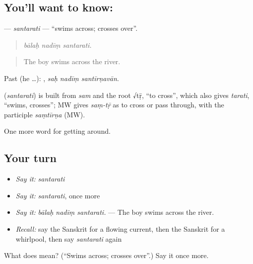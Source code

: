 \subsection*{You'll want to know: }
\textbf{} — \emph{santarati} — \textquotedblleft{}swims across; crosses over\textquotedblright{}.

\begin{quote}
  
\end{quote}

\begin{quote}
\emph{bālaḥ nadīṃ santarati.}
\end{quote}

\begin{quote}
The boy swims across the river.
\end{quote}

Past (he …):   , \emph{saḥ nadīṃ santīrṇavān}.

\begin{cousinweb}
\textbf{} (\emph{santarati}) is built from \emph{sam} and the root √tṝ, \textquotedblleft{}to cross\textquotedblright{}, which also gives \emph{tarati}, \textquotedblleft{}swims, crosses\textquotedblright{}; MW gives \emph{saṃ-tṝ} as to cross or pass through, with the participle \emph{saṃtīrṇa} (MW).
\end{cousinweb}

\begin{grammarlens}[title={What you've built}]
One more word for getting around.
\end{grammarlens}

\subsection*{Your turn}
\begin{itemize}
\raggedright
  \item \emph{Say it:} \emph{santarati}
  \item \emph{Say it:} \emph{santarati}, once more
  \item \emph{Say it:} \emph{bālaḥ nadīṃ santarati.} — The boy swims across the river.
  \item \emph{Recall:} say the Sanskrit for a flowing current, then the Sanskrit for a whirlpool, then say \emph{santarati} again
\end{itemize}

\begin{tcolorbox}[breakable,colback=teal!4,colframe=teal!35!black,title={Before you move on}]
What does  mean? (\textquotedblleft{}Swims across; crosses over\textquotedblright{}.) Say it once more.
\end{tcolorbox}
